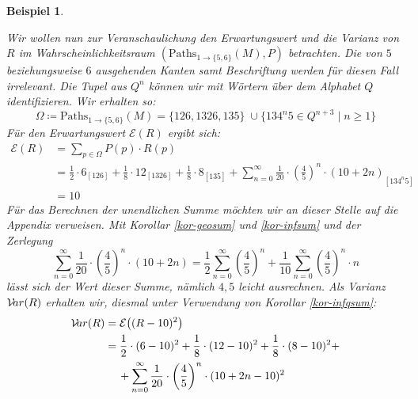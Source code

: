 \documentclass[a4paper]{article}
\newtheorem{beispiel}[satz]{Beispiel}
\theoremstyle{nonumberplain}
\begin{document}
\begin{beispiel}
\begin{center}
	\end{center}
	Wir wollen nun zur Veranschaulichung den Erwartungswert und die Varianz von $R$ im Wahrscheinlichkeitsraum $(\mathrm{Paths}_{1 \rightarrow \{5,6\}}(M), P)$ betrachten. Die von $5$ beziehungsweise $6$ ausgehenden Kanten samt Beschriftung werden für diesen Fall irrelevant. Die Tupel aus $Q^n$ können wir mit Wörtern über dem Alphabet $Q$ identifizieren. Wir erhalten so:
	\begin{equation*}
	\Omega \coloneqq \mathrm{Paths}_{1 \rightarrow \{5,6\}}(M) = \big\{126,1326,135\big\} \; \cup \big\{134^n5 \in Q^{n+3} \mid n\geq 1\big\} 
	\end{equation*}
	Für den Erwartungswert $\mathcal{E}(R)$ ergibt sich:
	\newcommand{\exres}{10}
	\begin{align*}
	\mathcal{E}(R) & = \sum_{p \in \Omega}{P(p) \cdot R(p)}\\
	& = \frac{1}{2}\cdot 6_{\scriptscriptstyle [126]} + \frac{1}{8}\cdot 12_{\scriptscriptstyle [1326]} + \frac{1}{8}\cdot 8_{\scriptscriptstyle [135]} + \sum_{n = 0}^{\infty}{\frac{1}{20}\cdot\left(\frac{4}{5}\right)^n \cdot (10 + 2n)}_{\scriptscriptstyle [134^n5]} \\
	& = \exres{}
	\end{align*}
	Für das Berechnen der unendlichen Summe möchten wir an dieser Stelle auf die Appendix verweisen. Mit Korollar \ref{kor-geosum} und \ref{kor-infsum} und der Zerlegung
	\begin{equation*}
		\sum_{n = 0}^{\infty}{\frac{1}{20}\cdot\left(\frac{4}{5}\right)^n \cdot (10 + 2n)}
		= \frac{1}{2}\sum_{n = 0}^{\infty}{\left(\frac{4}{5}\right)^n} + \frac{1}{10} \sum_{n = 0}^{\infty}{\left(\frac{4}{5}\right)^n \cdot n}
	\end{equation*}
	lässt sich der Wert dieser Summe, nämlich $4,5$ leicht ausrechnen.
	Als Varianz $\mathcal{V}\!ar(R)$ erhalten wir, diesmal unter Verwendung von Korollar \ref{kor-infqsum}:
	\begin{align*}
		\mvar(R) & = \mathcal{E}\big((R - \exres{})^2\big) \\
		& = \frac{1}{2}\cdot (6 - \exres)^2+ \frac{1}{8}\cdot (12-\exres)^2 + \frac{1}{8}\cdot (8-\exres)^2 + \\
		& \hspace{1.2em} + \sum_{n = 0}^{\infty}{\frac{1}{20}\cdot\left(\frac{4}{5}\right)^n \cdot (10 + 2n - \exres)^2} \\

\end{align*}
\end{beispiel}
\end{document}

